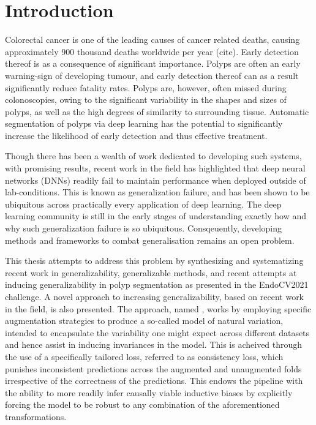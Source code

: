    \chapter{Introduction}
    \setcounter{chapter}{1}
    Colorectal cancer is one of the leading causes of cancer related deaths, causing approximately 900 thousand deaths worldwide per year (cite). Early detection thereof is as a consequence of significant importance. Polyps are often an early warning-sign of developing tumour, and early detection thereof can as a result significantly reduce fatality rates. Polyps are, however, often missed during colonoscopies, owing to the significant variability in the shapes and sizes of polyps, as well as the high degrees of similarity to surrounding tissue. Automatic segmentation of polyps via deep learning has the potential to significantly increase the likelihood of early detection and thus effective treatment. 
    
    Though there has been a wealth of work dedicated to developing such systems, with promising results, recent work in the field has highlighted that deep neural networks (DNNs) readily fail to maintain performance when deployed outside of lab-conditions. This is known as generalization failure, and has been shown to be ubiquitous across practically every application of deep learning. The deep learning community is still in the early stages of understanding exactly how and why such generalization failure is so ubiquitous. Consqeuently, developing methods and frameworks to combat generalisation remains an open problem. 

    This thesis attempts to address this problem by synthesizing and systematizing recent work in generalizability, generalizable methods, and recent attempts at inducing generalizability in polyp segmentation as presented in the EndoCV2021 challenge. A novel approach to increasing generalizability, based on recent work in the field, is also presented. The approach, named \alg,  works by employing specific augmentation strategies to produce a so-called model of natural variation, intended to encapsulate the variability one might expect across different datasets and hence assist in inducing invariances in the model. This is acheived through the use of a specifically tailored loss, referred to as consistency loss, which punishes inconsistent predictions across the augmented and unaugmented folds irrespective of the correctness of the predictions. This endows the pipeline with the ability to more readily infer causally viable inductive biases by explicitly forcing the model to be robust to any combination of the aforementioned transformations. 
    

